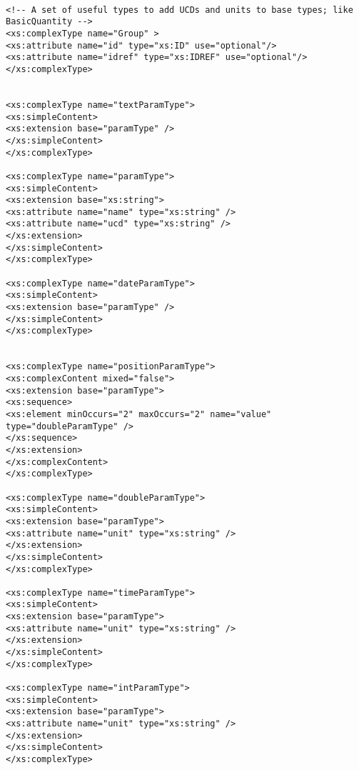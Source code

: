 {\begin{flushleft}
\begin{fmppage}
\begin{verbatim}
\end{verbatim}
\end{fmppage}

\begin{fmppage}
\begin{verbatim}

<!-- A set of useful types to add UCDs and units to base types; like BasicQuantity -->
<xs:complexType name="Group" >
<xs:attribute name="id" type="xs:ID" use="optional"/>
<xs:attribute name="idref" type="xs:IDREF" use="optional"/>
</xs:complexType>


<xs:complexType name="textParamType">
<xs:simpleContent>
<xs:extension base="paramType" />
</xs:simpleContent>
</xs:complexType>

<xs:complexType name="paramType">
<xs:simpleContent>
<xs:extension base="xs:string">
<xs:attribute name="name" type="xs:string" />
<xs:attribute name="ucd" type="xs:string" />
</xs:extension>
</xs:simpleContent>
</xs:complexType>

<xs:complexType name="dateParamType">
<xs:simpleContent>
<xs:extension base="paramType" />
</xs:simpleContent>
</xs:complexType>


<xs:complexType name="positionParamType">
<xs:complexContent mixed="false">
<xs:extension base="paramType">
<xs:sequence>
<xs:element minOccurs="2" maxOccurs="2" name="value" type="doubleParamType" />
</xs:sequence>
</xs:extension>
</xs:complexContent>
</xs:complexType>

<xs:complexType name="doubleParamType">
<xs:simpleContent>
<xs:extension base="paramType">
<xs:attribute name="unit" type="xs:string" />
</xs:extension>
</xs:simpleContent>
</xs:complexType>

<xs:complexType name="timeParamType">
<xs:simpleContent>
<xs:extension base="paramType">
<xs:attribute name="unit" type="xs:string" />
</xs:extension>
</xs:simpleContent>
</xs:complexType>

<xs:complexType name="intParamType">
<xs:simpleContent>
<xs:extension base="paramType">
<xs:attribute name="unit" type="xs:string" />
</xs:extension>
</xs:simpleContent>
</xs:complexType>

\end{verbatim}
\end{fmppage}

\begin{fmppage}
\begin{verbatim}



\end{verbatim}
\end{fmppage}
\end{flushleft}}
